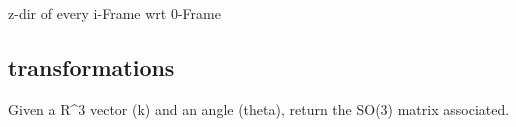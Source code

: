 \documentclass[letterpaper,10pt,english]{sphinxmanual}
\begin{document}
\begin{fulllineitems}
\begin{fulllineitems}
\end{fulllineitems}


\begin{fulllineitems}
\label{\detokenize{_src/didactic:rkd.didactic.core.Robot.z}}
z-dir of every i-Frame wrt 0-Frame

\end{fulllineitems}


\end{fulllineitems}



\subsection{transformations}
\label{\detokenize{_src/didactic:transformations}}\label{\detokenize{_src/didactic:module-rkd.didactic.transformations}}

\begin{fulllineitems}
\label{\detokenize{_src/didactic:rkd.didactic.transformations.axa2rot}}
Given a R\textasciicircum{}3 vector (k) and an angle (theta), return 
the SO(3) matrix associated.

\end{fulllineitems}

\end{document}
